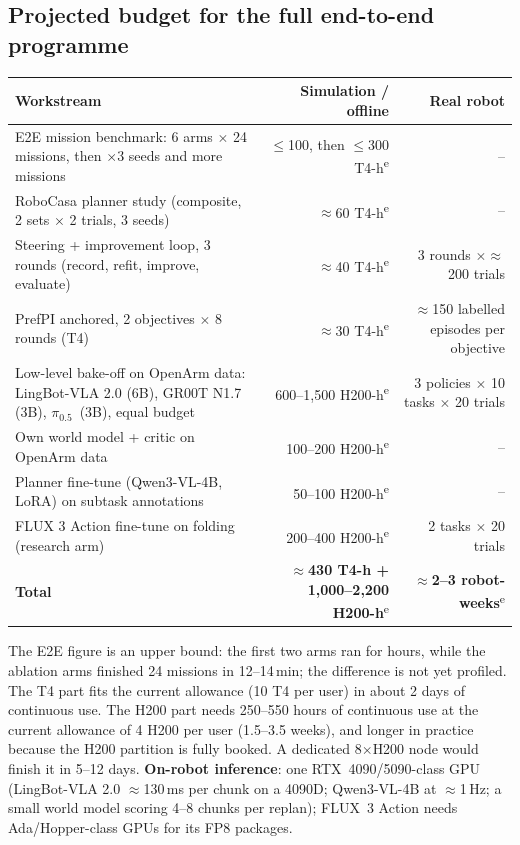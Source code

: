 \documentclass[10pt,a4paper]{article}
\newcommand{\pzf}{$\pi_{0.5}$}
\DeclareRobustCommand{\est}{\textsuperscript{\textcolor{orange!80!black}{e}}}
\begin{document}
\subsection{Projected budget for the full end-to-end programme}
\begin{small}
\begin{tabularx}{\textwidth}{Yrr}
\toprule
Workstream & Simulation / offline & Real robot \\
\midrule
E2E mission benchmark: 6 arms $\times$ 24 missions, then $\times$3 seeds and more missions & $\le$100, then $\le$300 T4-h\est & -- \\
RoboCasa planner study (composite, 2 sets $\times$ 2 trials, 3 seeds) & $\approx$60 T4-h\est & -- \\
Steering + improvement loop, 3 rounds (record, refit, improve, evaluate) & $\approx$40 T4-h\est & 3 rounds $\times\approx$200 trials \\
PrefPI anchored, 2 objectives $\times$ 8 rounds (T4) & $\approx$30 T4-h\est & $\approx$150 labelled episodes per objective \\
Low-level bake-off on OpenArm data: LingBot-VLA 2.0 (6B), GR00T N1.7 (3B), \pzf\ (3B), equal budget & 600--1,500 H200-h\est & 3 policies $\times$ 10 tasks $\times$ 20 trials \\
Own world model + critic on OpenArm data & 100--200 H200-h\est & -- \\
Planner fine-tune (Qwen3-VL-4B, LoRA) on subtask annotations & 50--100 H200-h\est & -- \\
FLUX 3 Action fine-tune on folding (research arm) & 200--400 H200-h\est & 2 tasks $\times$ 20 trials \\
\midrule
\textbf{Total} & \textbf{$\approx$430 T4-h + 1,000--2,200 H200-h}\est & \textbf{$\approx$2--3 robot-weeks}\est \\
\bottomrule
\end{tabularx}
\end{small}
\noindent The E2E figure is an upper bound: the first two arms ran for hours, while the ablation arms finished 24 missions in 12--14\,min; the difference is not yet profiled. The T4 part fits the current allowance (10 T4 per user) in about 2 days of continuous use. The H200 part needs 250--550 hours of continuous use at the current allowance of 4 H200 per user (1.5--3.5 weeks), and longer in practice because the H200 partition is fully booked. A dedicated 8$\times$H200 node would finish it in 5--12 days. \textbf{On-robot inference}: one RTX~4090/5090-class GPU (LingBot-VLA 2.0 $\approx$130\,ms per chunk on a 4090D; Qwen3-VL-4B at $\approx$1\,Hz; a small world model scoring 4--8 chunks per replan); FLUX~3 Action needs Ada/Hopper-class GPUs for its FP8 packages.
\end{document}
